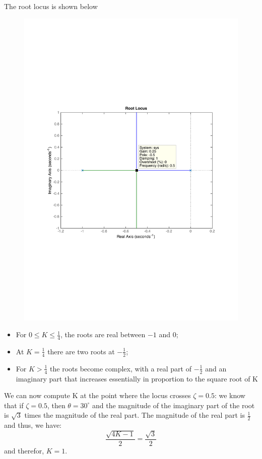 \begin{frame}
	\begin{exampleblock}{}
		The root locus is shown below
		\begin{figure}
			\centering
			\includegraphics[width=0.7\linewidth]{root_locus_ex1}
		\end{figure}
	\end{exampleblock}
\end{frame}

\begin{frame}
	\begin{exampleblock}{}
		\begin{itemize}
		\item For $0\leq K \leq \frac{1}{4}$, the roots are real between $-1$ and $0$;
		\item At $K = \frac{1}{4}$ there are two roots at $-\frac{1}{2}$;
		\item For $K>\frac{1}{4}$ the roots become complex, with a real part of $-\frac{1}{2}$ and an imaginary part that increases essentially in proportion to the square root of K
		\end{itemize}
		\vspace{1em}
		We can now compute K at the point where the locus crosses $\zeta = 0.5$: we know that if $\zeta = 0.5$, then $\theta = 30^{\circ}$ and the magnitude of the imaginary part of the root is $\sqrt{3}$ times the magnitude of the real part. The magnitude of the real part is $\frac{1}{2}$ and thus, we have: \begin{equation}
		\frac{\sqrt{4K - 1}}{2} = \frac{\sqrt{3}}{2}
		\end{equation}
		and therefor, $K = 1$.
		\end{exampleblock}
\end{frame}

